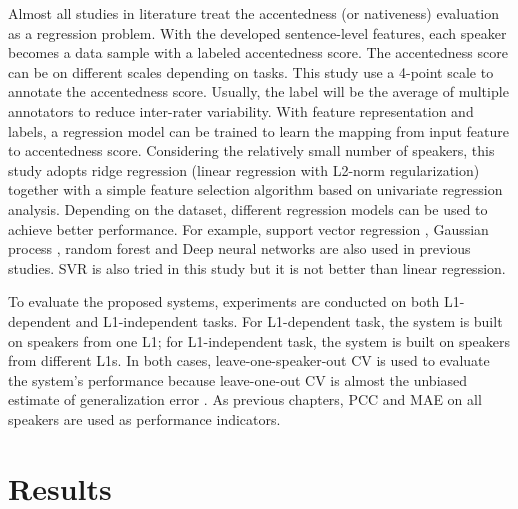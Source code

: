 Almost all studies in literature treat the accentedness (or nativeness) evaluation as a regression problem. With the developed sentence-level features, each speaker becomes a data sample with a labeled accentedness score. The accentedness score can be on different scales depending on tasks. This study use a 4-point scale to annotate the accentedness score. Usually, the label will be the average of multiple annotators to reduce inter-rater variability. With feature representation and labels, a regression model can be trained to learn the mapping from input feature to accentedness score. Considering the relatively small number of speakers, this study adopts ridge regression (linear regression with L2-norm regularization) together with a simple feature selection algorithm based on univariate regression analysis. Depending on the dataset, different regression models can be used to achieve better performance. For example, support vector regression \citep{black2015automated}, Gaussian process \citep{grosz2015assessing}, random forest \citep{qian2017bidirectional} and Deep neural networks \citep{grosz2015assessing} are also used in previous studies. SVR is also tried in this study but it is not better than linear regression.

To evaluate the proposed systems, experiments are conducted on both L1-dependent and L1-independent tasks. For L1-dependent task, the system is built on speakers from one L1; for L1-independent task, the system is built on speakers from different L1s. In both cases, leave-one-speaker-out CV is used to evaluate the system's performance because leave-one-out CV is almost the unbiased estimate of generalization error \citep{elisseeff2003leave}. As previous chapters, PCC and MAE on all speakers are used as performance indicators.

\section{Results}


